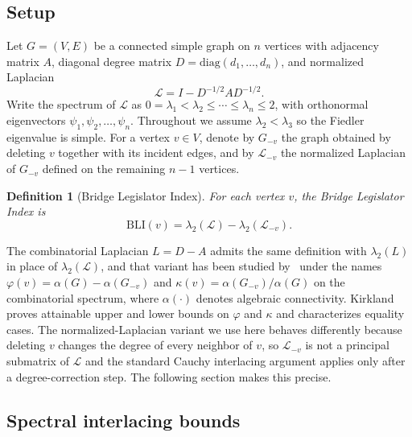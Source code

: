 \documentclass[12pt, a4paper]{article}
\newtheorem{definition}{Definition}
\begin{document}
\subsection{Setup}\label{subsec:bli_setup}

Let $G = (V, E)$ be a connected simple graph on $n$ vertices with adjacency matrix $A$, diagonal degree matrix $D = \mathrm{diag}(d_1, \ldots, d_n)$, and normalized Laplacian
\begin{equation}
\mathcal{L} = I - D^{-1/2} A D^{-1/2}.
\end{equation}
Write the spectrum of $\mathcal{L}$ as $0 = \lambda_1 < \lambda_2 \leq \cdots \leq \lambda_n \leq 2$, with orthonormal eigenvectors $\psi_1, \psi_2, \ldots, \psi_n$. Throughout we assume $\lambda_2 < \lambda_3$ so the Fiedler eigenvalue is simple. For a vertex $v \in V$, denote by $G_{-v}$ the graph obtained by deleting $v$ together with its incident edges, and by $\mathcal{L}_{-v}$ the normalized Laplacian of $G_{-v}$ defined on the remaining $n - 1$ vertices.

\begin{definition}[Bridge Legislator Index]
For each vertex $v$, the Bridge Legislator Index is
\begin{equation}
\mathrm{BLI}(v) = \lambda_2(\mathcal{L}) - \lambda_2(\mathcal{L}_{-v}).
\end{equation}
\end{definition}

The combinatorial Laplacian $L = D - A$ admits the same definition with $\lambda_2(L)$ in place of $\lambda_2(\mathcal{L})$, and that variant has been studied by~\citet{kirkland2010algebraic} under the names $\varphi(v) = \alpha(G) - \alpha(G_{-v})$ and $\kappa(v) = \alpha(G_{-v}) / \alpha(G)$ on the combinatorial spectrum, where $\alpha(\cdot)$ denotes algebraic connectivity. Kirkland proves attainable upper and lower bounds on $\varphi$ and $\kappa$ and characterizes equality cases. The normalized-Laplacian variant we use here behaves differently because deleting $v$ changes the degree of every neighbor of $v$, so $\mathcal{L}_{-v}$ is not a principal submatrix of $\mathcal{L}$ and the standard Cauchy interlacing argument applies only after a degree-correction step. The following section makes this precise.

\subsection{Spectral interlacing bounds}\label{subsec:bli_interlacing}
\end{document}
